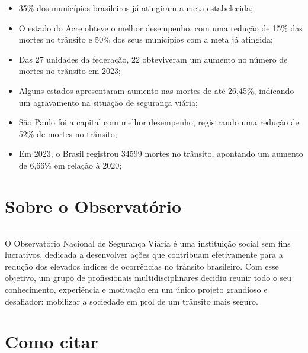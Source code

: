 \documentclass[
  letterpaper,
  DIV=11,
  numbers=noendperiod]{scrreprt}
\providecommand{\tightlist}{%
  \setlength{\itemsep}{0pt}\setlength{\parskip}{0pt}}\usepackage{longtable,booktabs,array}
\begin{document}
\begin{itemize}
\tightlist
\item
  35\% dos municípios brasileiros já atingiram a meta estabelecida;
\item
  O estado do Acre obteve o melhor desempenho, com uma redução de 15\%
  das mortes no trânsito e 50\% dos seus municípios com a meta já
  atingida;
\item
  Das 27 unidades da federação, 22 obteviveram um aumento no número de
  mortes no trânsito em 2023;
\item
  Alguns estados apresentaram aumento nas mortes de até 26,45\%,
  indicando um agravamento na situação de segurança viária;
\item
  São Paulo foi a capital com melhor desempenho, registrando uma redução
  de 52\% de mortes no trânsito;
\item
  Em 2023, o Brasil registrou 34599 mortes no trânsito, apontando um
  aumento de 6,66\% em relação à 2020;
\end{itemize}


\chapter*{Sobre o Observatório}\label{sobre-o-observatuxf3rio}


\begin{center}\rule{0.5\linewidth}{0.5pt}\end{center}

O Observatório Nacional de Segurança Viária é uma instituição social sem
fins lucrativos, dedicada a desenvolver ações que contribuam
efetivamente para a redução dos elevados índices de ocorrências no
trânsito brasileiro. Com esse objetivo, um grupo de profissionais
multidisciplinares decidiu reunir todo o seu conhecimento, experiência e
motivação em um único projeto grandioso e desafiador: mobilizar a
sociedade em prol de um trânsito mais seguro.


\chapter*{Como citar}\label{como-citar}

\end{document}
